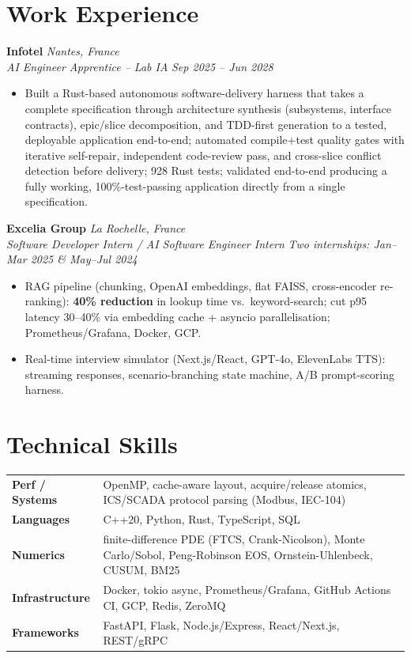 \documentclass[10pt]{article}
\newcommand{\entry}[4]{%
  \noindent\textbf{#1} \hfill \textit{#2} \\
  \textit{#3} \hfill \textit{#4}\\[-0.22em]
}
\begin{document}
\section*{Work Experience}
\entry{Infotel}{Nantes, France}{AI Engineer Apprentice -- Lab IA}{Sep 2025 -- Jun 2028}
\begin{itemize}
  \item Built a Rust-based autonomous software-delivery harness that takes a complete specification through architecture synthesis (subsystems, interface contracts), epic/slice decomposition, and TDD-first generation to a tested, deployable application end-to-end; automated compile+test quality gates with iterative self-repair, independent code-review pass, and cross-slice conflict detection before delivery; 928 Rust tests; validated end-to-end producing a fully working, 100\%-test-passing application directly from a single specification.
\end{itemize}
\entry{Excelia Group}{La Rochelle, France}{Software Developer Intern / AI Software Engineer Intern}{Two internships: Jan--Mar 2025 \& May--Jul 2024}
\begin{itemize}
  \item RAG pipeline (chunking, OpenAI embeddings, flat FAISS, cross-encoder re-ranking): \textbf{40\% reduction} in lookup time vs.\ keyword-search; cut p95 latency 30--40\% via embedding cache + asyncio parallelisation; Prometheus/Grafana, Docker, GCP.
  \item Real-time interview simulator (Next.js/React, GPT-4o, ElevenLabs TTS): streaming responses, scenario-branching state machine, A/B prompt-scoring harness.
\end{itemize}

\section*{Technical Skills}
\noindent
\begin{tabular}{@{}p{2.7cm}p{15.5cm}@{}}
\textbf{Perf / Systems} & OpenMP, cache-aware layout, acquire/release atomics, ICS/SCADA protocol parsing (Modbus, IEC-104) \\
\textbf{Languages} & C++20, Python, Rust, TypeScript, SQL \\
\textbf{Numerics} & finite-difference PDE (FTCS, Crank-Nicolson), Monte Carlo/Sobol, Peng-Robinson EOS, Ornstein-Uhlenbeck, CUSUM, BM25 \\
\textbf{Infrastructure} & Docker, tokio async, Prometheus/Grafana, GitHub Actions CI, GCP, Redis, ZeroMQ \\
\textbf{Frameworks} & FastAPI, Flask, Node.js/Express, React/Next.js, REST/gRPC \\
\end{tabular}
\end{document}
